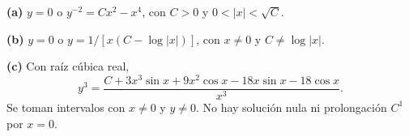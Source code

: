 \noindent\textbf{(a)} $y=0$ o $y^{-2}=Cx^2-x^4$, con $C>0$ y $0<|x|<\sqrt C$.

\noindent\textbf{(b)} $y=0$ o $y=1/[x(C-\log|x|)]$, con $x\ne0$ y $C\ne\log|x|$.

\noindent\textbf{(c)} Con raíz cúbica real,\[y^3=\frac{C+3x^3\sin x+9x^2\cos x-18x\sin x-18\cos x}{x^3}.\]Se toman intervalos con $x\ne0$ y $y\ne0$. No hay solución nula ni prolongación $C^1$ por $x=0$.
